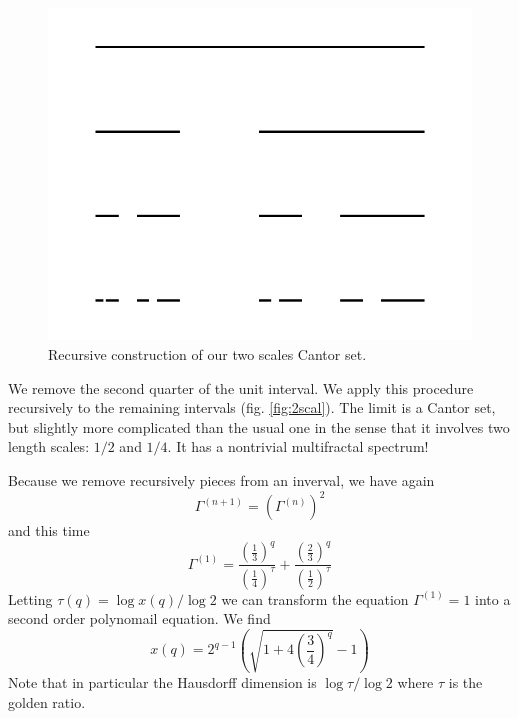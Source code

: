 \documentclass[11pt]{article}
\begin{document}
\begin{figure}[htp]
\centering
\includegraphics[scale=0.70]{two_scales_cantor_set.pdf}
\caption{Recursive construction of our two scales Cantor set.}
\label{fig:2scal}
\end{figure}

We remove the second quarter of the unit interval. We apply this procedure recursively to the remaining intervals (fig. \eqref{fig:2scal}). 
The limit is a Cantor set, but slightly more complicated than the usual one in the sense that it involves two length scales: $1/2$ and $1/4$.
It has a nontrivial multifractal spectrum!

Because we remove recursively pieces from an inverval, we have again
\begin{equation}
	\Gamma^{(n+1)} = \left( \Gamma^{(n)} \right)^2
\end{equation}
and this time
\begin{equation}
	\Gamma^{(1)} = \frac{\left( \frac{1}{3} \right)^q}{\left( \frac{1}{4} \right)^\tau} + \frac{\left( \frac{2}{3} \right)^q}{\left( \frac{1}{2} \right)^\tau}
\end{equation}
Letting $\tau(q) = \log x(q)/\log 2$ we can transform the equation $\Gamma^{(1)} = 1$ into a second order polynomail equation. We find
\begin{equation}
	x(q) = 2^{q-1} \left( \sqrt{1+ 4 \left( \frac{3}{4} \right)^q} -1 \right)
\end{equation}
Note that in particular the Hausdorff dimension is $\log \tau / \log 2$ where $\tau$ is the golden ratio.
\end{document}
